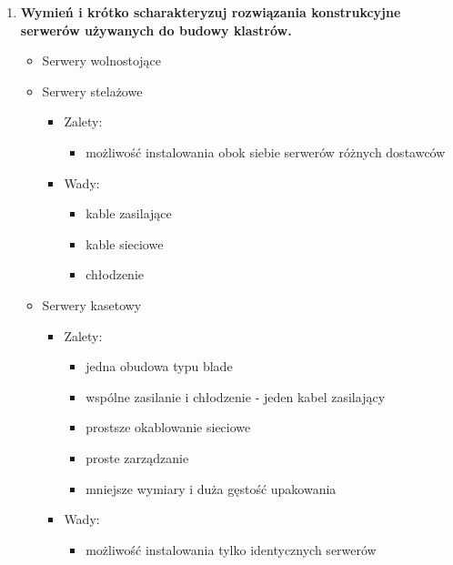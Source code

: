 \begin{enumerate}
			\item \textbf{Wymień i krótko scharakteryzuj rozwiązania konstrukcyjne serwerów używanych do budowy klastrów.}
			\begin{itemize}
				\item Serwery wolnostojące
				\item Serwery stelażowe
				\begin{itemize}
					\item Zalety:
					\begin{itemize}
						\item możliwość instalowania obok siebie serwerów różnych dostawców
					\end{itemize}
					\item Wady:
					\begin{itemize}
						\item kable zasilające
						\item kable sieciowe
						\item chłodzenie
					\end{itemize}
				\end{itemize}
				\item Serwery kasetowy
				\begin{itemize}
					\item Zalety:
					\begin{itemize}
						\item jedna obudowa typu blade
						\item wspólne zasilanie i chłodzenie - jeden kabel zasilający
						\item prostsze okablowanie sieciowe 
						\item proste zarządzanie
						\item mniejsze wymiary i duża gęstość upakowania
					\end{itemize}
					\item Wady:
					\begin{itemize}
						\item możliwość instalowania tylko identycznych serwerów
					\end{itemize}
				\end{itemize}
			\end{itemize}
		\end{enumerate}
	
	\newpage
